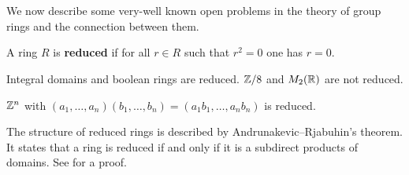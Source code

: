 \chapter{}

We now describe some very-well known open problems
in the theory of group rings and the connection between 
them. 

\begin{definition}
A ring $R$ is \textbf{reduced} if for all $r\in R$ such that 
$r^2=0$ one has $r=0$.
\end{definition}



Integral domains and boolean rings are reduced. $\mathbb{Z}/8$ 
and $M_2(\mathbb{R})$ are not reduced. 

\begin{example}
    $\mathbb{Z}^n$ with $(a_1,\dots,a_n)(b_1,\dots,b_n)=(a_1b_1,\dots,a_nb_n)$
    is reduced. 
\end{example}

The structure of 
reduced rings is described by
Andrunakevic--Rjabuhin's theorem. It states
that a ring is reduced if and only if
it is a subdirect products of domains. See
\cite[3.20.5]{MR2015465} for a proof. 



